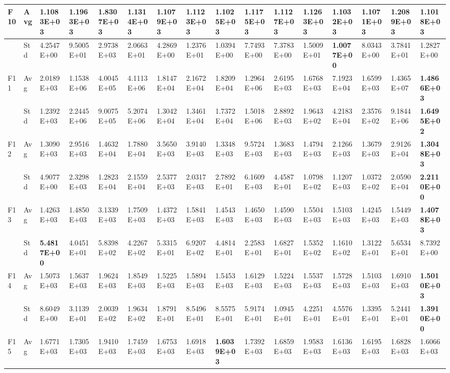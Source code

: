 \documentclass{article} %
\begin{document}
\begin{tabular}{|p{0.3in}|p{0.3in}|p{0.3in}|p{0.3in}|p{0.3in}|p{0.3in}|p{0.3in}|p{0.3in}|p{0.3in}|p{0.3in}|p{0.3in}|p{0.3in}|p{0.3in}|p{0.3in}|p{0.3in}|p{0.5in}|}
F10 & Avg & 1.1083E+03 & 1.1963E+03 & 1.8307E+03 & 1.1314E+03 & 1.1079E+03 & 1.1123E+03 & 1.1025E+03 & 1.1175E+03 & 1.1127E+03 & 1.1263E+03 & 1.1032E+03 & 1.1071E+03 & 1.2089E+03 & \textbf{1.1018E+03} \\ \hline 
 & Std & 4.2547E+00 & 9.5005E+01 & 2.9738E+03 & 2.0663E+01 & 4.2869E+00 & 1.2376E+01 & 1.0394E+00 & 7.7493E+00 & 7.3783E+00 & 1.5009E+01 & \textbf{1.0077E+00} & 8.0343E+00 & 3.7841E+01 & 1.2827E+00 \\ \hline 
F11 & Avg & 2.0189E+03 & 1.1538E+06 & 4.0045E+05 & 4.1113E+06 & 1.8147E+04 & 2.1672E+04 & 1.8209E+04 & 1.2964E+06 & 2.6195E+03 & 1.6768E+03 & 7.1923E+04 & 1.6599E+03 & 1.4365E+07 & \textbf{1.4866E+03} \\ \hline 
 & Std & 1.2392E+03 & 2.2445E+06 & 9.0075E+05 & 5.2074E+06 & 1.3042E+04 & 1.3461E+04 & 1.7372E+04 & 1.5018E+06 & 2.8892E+03 & 1.9643E+02 & 4.2183E+04 & 2.3576E+02 & 9.1844E+06 & \textbf{1.6495E+02} \\ \hline 
F12 & Avg & 1.3090E+03 & 2.9516E+03 & 1.4632E+04 & 1.7880E+04 & 3.5650E+03 & 3.9140E+03 & 1.3348E+03 & 9.5724E+03 & 1.3683E+03 & 1.4794E+03 & 2.1266E+03 & 1.3679E+03 & 2.9126E+04 & \textbf{1.3048E+03} \\ \hline 
 & Std & 4.9077E+00 & 2.3298E+03 & 1.2823E+04 & 2.1559E+04 & 2.5377E+03 & 2.0317E+03 & 2.7892E+01 & 6.1609E+03 & 4.4587E+01 & 1.0798E+02 & 1.1207E+03 & 1.0372E+02 & 2.0590E+04 & \textbf{2.2110E+00} \\ \hline 
F13 & Avg & 1.4263E+03 & 1.4850E+03 & 3.1339E+03 & 1.7509E+03 & 1.4372E+03 & 1.5841E+03 & 1.4543E+03 & 1.4650E+03 & 1.4590E+03 & 1.5504E+03 & 1.5103E+03 & 1.4245E+03 & 1.5449E+03 & \textbf{1.4078E+03} \\ \hline 
 & Std & \textbf{5.4817E+00} & 4.0451E+01 & 5.8398E+02 & 4.2267E+02 & 5.3315E+01 & 6.9207E+02 & 4.4814E+01 & 2.2583E+01 & 1.6827E+01 & 1.5352E+02 & 1.1610E+02 & 1.3122E+01 & 5.6534E+01 & 8.7392E+00 \\ \hline 
F14 & Avg & 1.5073E+03 & 1.5637E+03 & 1.9624E+03 & 1.8549E+03 & 1.5225E+03 & 1.5894E+03 & 1.5453E+03 & 1.6129E+03 & 1.5224E+03 & 1.5537E+03 & 1.5728E+03 & 1.5103E+03 & 1.6910E+03 & \textbf{1.5010E+03} \\ \hline 
 & Std & 8.6049E+00 & 3.1139E+01 & 2.0039E+02 & 1.9634E+02 & 1.8791E+01 & 8.5496E+01 & 8.5575E+01 & 5.9174E+01 & 1.0945E+01 & 4.2251E+01 & 4.5576E+01 & 1.3395E+01 & 5.2441E+01 & \textbf{1.3910E+00} \\ \hline 
F15 & Avg & 1.6771E+03 & 1.7305E+03 & 1.9410E+03 & 1.7459E+03 & 1.6753E+03 & 1.6918E+03 & \textbf{1.6039E+03} & 1.7392E+03 & 1.6859E+03 & 1.9583E+03 & 1.6136E+03 & 1.6195E+03 & 1.6828E+03 & 1.6066E+03 \\ \hline 

\end{tabular}
\end{document}
